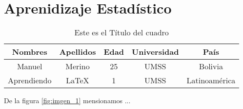\chapter{Aprenidizaje Estadístico} \label{cap:apren_esta}
	\lipsum \lipsum[1]
	
	\begin{table}
		\centering
		\begin{tabular}{ccccc}
			\hline
			Nombres & Apellidos & Edad & Universidad & País\\
			\hline
			Manuel & Merino & 25 & UMSS & Bolivia\\
			Aprendiendo & \LaTeX & 1 & UMSS & Latinoamérica\\
			\hline
		\end{tabular}
		\caption{Este es el Título del cuadro}
		\label{tab:primera_tabla}
	\end{table}

	De la figura \ref{fig:imgen_1} mensionamos ...
